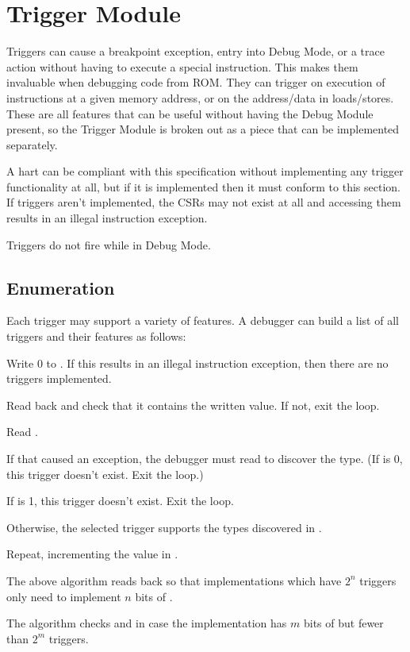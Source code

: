 \chapter{Trigger Module}
\label{sec:trigger}

Triggers can cause a breakpoint exception, entry into Debug Mode, or a trace action
without having to execute a special instruction. This makes them invaluable
when debugging code from ROM. They can trigger on execution of instructions at
a given memory address, or on the address/data in loads/stores.  These are all
features that can be useful without having the Debug Module present, so the
Trigger Module is broken out as a piece that can be implemented separately.

A hart can be compliant with this specification without implementing any
trigger functionality at all, but if it is implemented then it must conform to
this section. If triggers aren't implemented, the CSRs may not exist at all and
accessing them results in an illegal instruction exception.

Triggers do not fire while in Debug Mode.

\section{Enumeration}

\begin{steps}{Each trigger may support a variety of features. A debugger can
    build a list of all triggers and their features as follows:}
\item Write 0 to \RcsrTselect. If this results in an illegal instruction
    exception, then there are no triggers implemented.
\item Read back \RcsrTselect and check that it contains the written value. If not,
    exit the loop.
\item Read \RcsrTinfo.
\item If that caused an exception, the debugger must read \RcsrTdataOne to
    discover the type. (If \FcsrTdataOneType is 0, this trigger doesn't exist. Exit the
    loop.)
\item If \FcsrTinfoInfo is 1, this trigger doesn't exist. Exit the loop.
\item Otherwise, the selected trigger supports the types discovered in \FcsrTinfoInfo.
\item Repeat, incrementing the value in \RcsrTselect.
\end{steps}

\begin{commentary}
    The above algorithm reads back \RcsrTselect so that implementations which have
    $2^n$ triggers only need to implement $n$ bits of \RcsrTselect.

    The algorithm checks \RcsrTinfo and \FcsrTdataOneType in case the implementation has $m$
    bits of \RcsrTselect but fewer than $2^m$ triggers.
\end{commentary}

